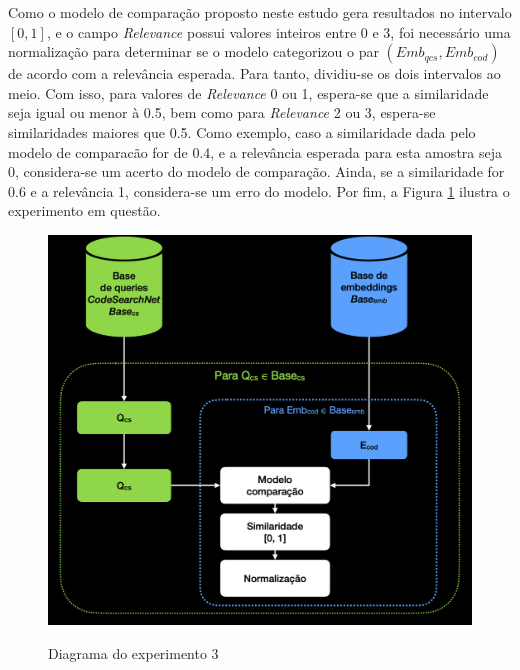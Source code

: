 Como o modelo de comparação proposto neste estudo gera resultados no intervalo $[0, 1]$, e o campo \textit{Relevance} possui valores inteiros entre 0 e 3, foi necessário uma normalização para determinar se o modelo categorizou o par $(Emb_{qcs}, Emb_{cod})$ de acordo com a relevância esperada. Para tanto, dividiu-se os dois intervalos ao meio. Com isso, para valores de \textit{Relevance} 0 ou 1, espera-se que a similaridade seja igual ou menor à 0.5, bem como para \textit{Relevance} 2 ou 3, espera-se similaridades maiores que 0.5. Como exemplo, caso a similaridade dada pelo modelo de comparacão for de $0.4$, e a relevância esperada para esta amostra seja 0, considera-se um acerto do modelo de comparação. Ainda, se a similaridade for $0.6$ e a relevância 1, considera-se um erro do modelo. Por fim, a Figura \ref{fig:experiment-3-diagram} ilustra o experimento em questão.

\begin{figure}[H]
    \centering
        \caption{Diagrama do experimento 3}
        \includegraphics[scale=0.4]{imagens/proposta-experimental/experiment-3.png}
        \label{fig:experiment-3-diagram}
\end{figure}
